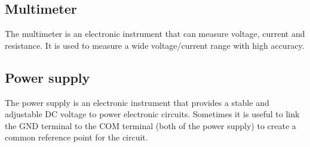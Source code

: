 \subsection{Multimeter}
The multimeter is an electronic instrument that can measure voltage, current and resistance. It is used to measure a wide
voltage/current range with high accuracy. 

\subsection{Power supply}
The power supply is an electronic instrument that provides a stable and adjustable DC voltage to power electronic circuits.
Sometimes it is useful to link the GND terminal to the COM terminal (both of the power supply) to create a common reference
point for the circuit.
